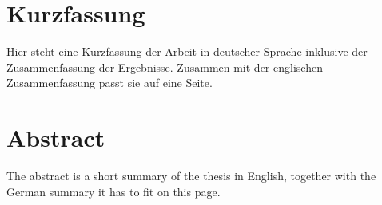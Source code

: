 \thispagestyle{plain}

\section*{Kurzfassung} %
Hier steht eine Kurzfassung der Arbeit in deutscher Sprache inklusive der Zusammenfassung der Ergebnisse. 
Zusammen mit der englischen Zusammenfassung passt sie auf eine Seite.

\section*{Abstract} %
\begin{english}
The abstract is a short summary of the thesis in English, together with the German summary it has to fit on this page.
\end{english}
